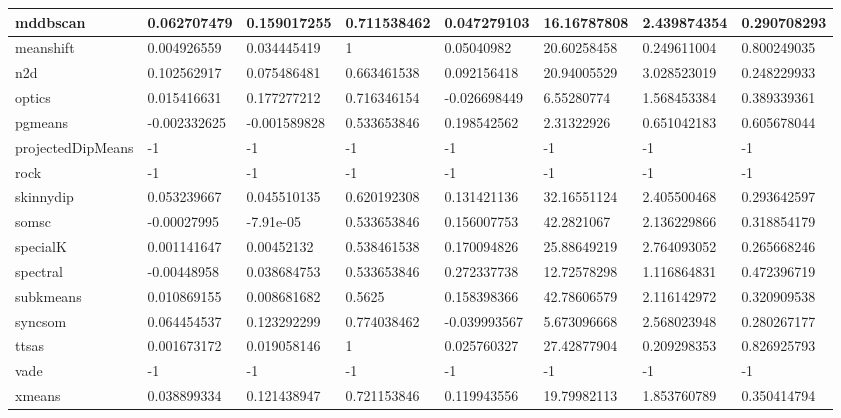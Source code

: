 \begin{table}[H]
\begin{tabular}{|l|l|l|l|l|l|l|l|}
mddbscan & 0.062707479 & 0.159017255 & 0.711538462 & 0.047279103 & 16.16787808 & 2.439874354 & 0.290708293 \\
\hline
meanshift & 0.004926559 & 0.034445419 & 1 & 0.05040982 & 20.60258458 & 0.249611004 & 0.800249035 \\
\hline
n2d & 0.102562917 & 0.075486481 & 0.663461538 & 0.092156418 & 20.94005529 & 3.028523019 & 0.248229933 \\
\hline
optics & 0.015416631 & 0.177277212 & 0.716346154 & -0.026698449 & 6.55280774 & 1.568453384 & 0.389339361 \\
\hline
pgmeans & -0.002332625 & -0.001589828 & 0.533653846 & 0.198542562 & 2.31322926 & 0.651042183 & 0.605678044 \\
\hline
projectedDipMeans & -1 & -1 & -1 & -1 & -1 & -1 & -1 \\
\hline
rock & -1 & -1 & -1 & -1 & -1 & -1 & -1 \\
\hline
skinnydip & 0.053239667 & 0.045510135 & 0.620192308 & 0.131421136 & 32.16551124 & 2.405500468 & 0.293642597 \\
\hline
somsc & -0.00027995 & -7.91e-05 & 0.533653846 & 0.156007753 & 42.2821067 & 2.136229866 & 0.318854179 \\
\hline
specialK & 0.001141647 & 0.00452132 & 0.538461538 & 0.170094826 & 25.88649219 & 2.764093052 & 0.265668246 \\
\hline
spectral & -0.00448958 & 0.038684753 & 0.533653846 & 0.272337738 & 12.72578298 & 1.116864831 & 0.472396719 \\
\hline
subkmeans & 0.010869155 & 0.008681682 & 0.5625 & 0.158398366 & 42.78606579 & 2.116142972 & 0.320909538 \\
\hline
syncsom & 0.064454537 & 0.123292299 & 0.774038462 & -0.039993567 & 5.673096668 & 2.568023948 & 0.280267177 \\
\hline
ttsas & 0.001673172 & 0.019058146 & 1 & 0.025760327 & 27.42877904 & 0.209298353 & 0.826925793 \\
\hline
vade & -1 & -1 & -1 & -1 & -1 & -1 & -1 \\
\hline
xmeans & 0.038899334 & 0.121438947 & 0.721153846 & 0.119943556 & 19.79982113 & 1.853760789 & 0.350414794 \\
\hline
\end{tabular}
\end{table}

\clearpage


